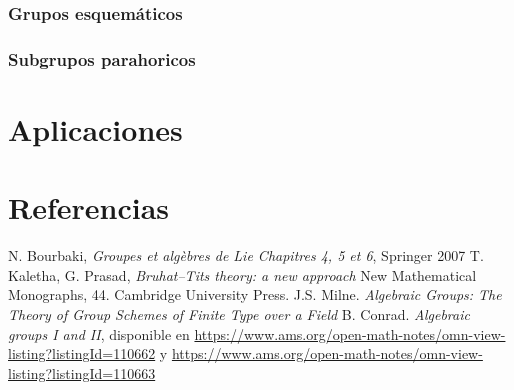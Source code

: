 \documentclass[oneside,12pt]{amsart}
\theoremstyle{definition}
\numberwithin{equation}{section}
\begin{document}
\subsubsection*{Grupos esquem\'aticos}
\subsubsection*{Subgrupos parahoricos}


\section{Aplicaciones}


\section*{Referencias}
\begin{thebibliography}{99}
     N. Bourbaki, \emph{Groupes et algèbres de Lie
    Chapitres 4, 5 et 6}, Springer 2007
    T. Kaletha, G. Prasad, \emph{Bruhat–Tits theory: a new approach}
    New Mathematical Monographs, 44. Cambridge University Press.
     J.S. Milne. \emph{Algebraic Groups: The Theory of Group Schemes of Finite Type over a Field}
    B. Conrad. \emph{Algebraic groups I and II},
    disponible en \href{https://www.ams.org/open-math-notes/omn-view-listing?listingId=110662}{https://www.ams.org/open-math-notes/omn-view-listing?listingId=110662} y 
    \href{https://www.ams.org/open-math-notes/omn-view-listing?listingId=110663}{https://www.ams.org/open-math-notes/omn-view-listing?listingId=110663}
\end{thebibliography}
    
\end{document}
